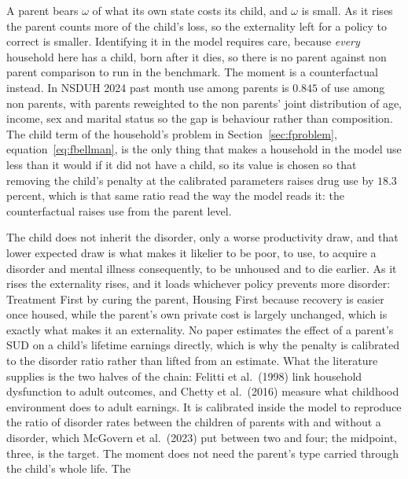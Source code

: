 \documentclass[10pt]{article}
\begin{document}
\begin{description}\setlength{\itemsep}{0.25em}\setlength{\parskip}{0em}
\item[$\omega$, the parent's weight on its child.] A parent bears $\omega$ of what
its own state costs its child, and $\omega$ is small. As it
rises the parent counts more of the child's loss, so the externality left
for a policy to correct is smaller. Identifying it in the model requires
care, because \emph{every} household here has a child, born after it dies, so there is no parent
against non parent comparison to run in the benchmark. The moment is a
counterfactual instead. In NSDUH 2024 past month use among parents is $0.845$ of
use among non parents, with parents reweighted to the non parents' joint
distribution of age, income, sex and marital status so the gap is behaviour rather
than composition. The child term of the household's problem in
Section~\ref{sec:fproblem}, equation~\eqref{eq:fbellman}, is the only
thing that makes a household in the model use less than it would if it did not
have a child, so its
value is chosen so that removing the child's penalty at the calibrated parameters
raises drug use by $18.3$ percent, which is that same ratio read the
way the model reads it: the counterfactual raises use from the parent level.
\item[$\delta_d$, what the child loses to a parent's SUD.] The child does not inherit
the disorder, only a worse
productivity draw, and that lower expected draw is what makes it likelier to be poor, to use, to
acquire a disorder and mental illness consequently, to be unhoused and to die
earlier.
As it rises the externality rises, and it loads whichever policy prevents more
disorder: Treatment First by curing the parent, Housing First because recovery is
easier once housed,
while the parent's own private cost is largely unchanged, which is exactly what makes it an
externality. No paper estimates the effect of a parent's SUD on a child's lifetime
earnings directly, which is why the penalty is calibrated to the disorder ratio
rather than lifted from an estimate. What the literature supplies is the two halves
of the chain: Felitti et al.\ (1998) link household dysfunction to adult outcomes,
and Chetty et al.\ (2016) measure what childhood environment does to adult earnings.
It is calibrated inside the model to reproduce the ratio of disorder rates
between the children of parents with and without a disorder, which McGovern et
al.\ (2023) put between two and four; the midpoint, three, is the target. The
moment does not need the parent's type carried through the child's whole life. The

\end{description}
\end{document}
